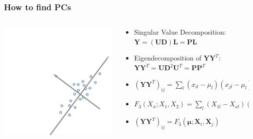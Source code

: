 \documentclass[11pt]{beamer}
\newcommand{\MX}{\mathbf{X}} %
\newcommand{\MY}{\mathbf{Y}} %
\newcommand{\MP}{\mathbf{P}} %
\newcommand{\MEAN}{\boldsymbol{\mu}} %
\newcommand{\POP}[1]{X_{#1}}
\newcommand{\FX}[1]{F_{#1}}
\begin{document}
\begin{frame}
\frametitle{How to find PCs}
\begin{columns}
\begin{column}{0.4\textwidth}
	\includegraphics[width=\textwidth]{figures/pca3.pdf}
\end{column}
\begin{column}{0.7\textwidth}
	\begin{itemize}
		\item<1-> Singular Value Decomposition: $\MY = (\mathbf{U}\mathbf{D})\mathbf{L} = \mathbf{P}\mathbf{L}$
		\item<2-> Eigendecomposition of $\MY\MY^T$: $\MY\MY^T = \mathbf{U}\mathbf{D}^2\mathbf{U}^T = \MP\MP^T$
		\only<3>{\item $(\MY\MY^T)_{ij}$}
		\item<4-> $(\MY\MY^T)_{ij} = \sum_l (x_{il} - \mu_l)(x_{jl} - \mu_l)$
		\item<5-> \small{$\FX3(\POP{x}; \POP1, \POP2) = \sum_l(X_{1l}-X_{xl})(X_{2l}-X_{xl})$}
		\item<6-> $(\MY\MY^T)_{ij} = F_3(\MEAN; \MX_i, \MX_j)$
	\end{itemize}
\end{column}			
\end{columns}
\vspace{30px}
\end{frame}
\end{document}
